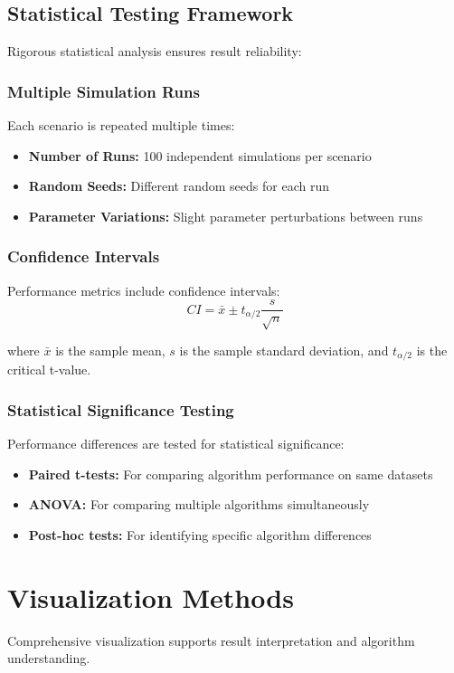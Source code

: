 \subsection{Statistical Testing Framework}
Rigorous statistical analysis ensures result reliability:

\subsubsection{Multiple Simulation Runs}
Each scenario is repeated multiple times:
\begin{itemize}
\item \textbf{Number of Runs:} 100 independent simulations per scenario
\item \textbf{Random Seeds:} Different random seeds for each run
\item \textbf{Parameter Variations:} Slight parameter perturbations between runs
\end{itemize}

\subsubsection{Confidence Intervals}
Performance metrics include confidence intervals:
\begin{equation}
CI = \bar{x} \pm t_{\alpha/2} \frac{s}{\sqrt{n}}
\end{equation}

where $\bar{x}$ is the sample mean, $s$ is the sample standard deviation, and $t_{\alpha/2}$ is the critical t-value.

\subsubsection{Statistical Significance Testing}
Performance differences are tested for statistical significance:
\begin{itemize}
\item \textbf{Paired t-tests:} For comparing algorithm performance on same datasets
\item \textbf{ANOVA:} For comparing multiple algorithms simultaneously
\item \textbf{Post-hoc tests:} For identifying specific algorithm differences
\end{itemize}

\section{Visualization Methods}
Comprehensive visualization supports result interpretation and algorithm understanding.

